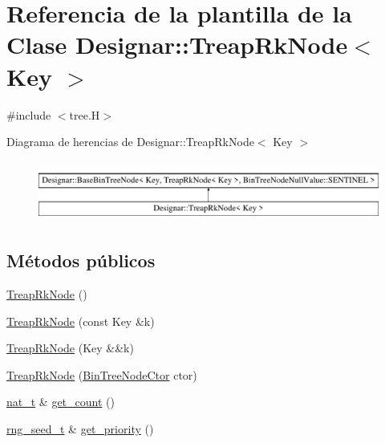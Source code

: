 \hypertarget{class_designar_1_1_treap_rk_node}{}\section{Referencia de la plantilla de la Clase Designar\+:\+:Treap\+Rk\+Node$<$ Key $>$}
\label{class_designar_1_1_treap_rk_node}


{\ttfamily \#include $<$tree.\+H$>$}

Diagrama de herencias de Designar\+:\+:Treap\+Rk\+Node$<$ Key $>$\begin{figure}[H]
\begin{center}
\leavevmode
\includegraphics[height=2.000000cm]{class_designar_1_1_treap_rk_node}
\end{center}
\end{figure}
\subsection*{Métodos públicos}
\begin{DoxyCompactItemize}
\item 
\hyperlink{class_designar_1_1_treap_rk_node_a477ff390f32fe63244a0d69fb29fe72d}{Treap\+Rk\+Node} ()
\item 
\hyperlink{class_designar_1_1_treap_rk_node_af478d4d739e9f7cacf8337421f3dabcb}{Treap\+Rk\+Node} (const Key \&k)
\item 
\hyperlink{class_designar_1_1_treap_rk_node_a81c5eee2937311cfee5b30a03cd16a04}{Treap\+Rk\+Node} (Key \&\&k)
\item 
\hyperlink{class_designar_1_1_treap_rk_node_aeac25432a807225359883033f50404eb}{Treap\+Rk\+Node} (\hyperlink{namespace_designar_a679bc99fd69a3601faa5d6d47f865106}{Bin\+Tree\+Node\+Ctor} ctor)
\item 
\hyperlink{namespace_designar_aa72662848b9f4815e7bf31a7cf3e33d1}{nat\+\_\+t} \& \hyperlink{class_designar_1_1_treap_rk_node_a4396d6cb73dc8df8cdae3a94565995ef}{get\+\_\+count} ()
\item 
\hyperlink{namespace_designar_ad621b5646d45288c5d6a1e1dfe7531a8}{rng\+\_\+seed\+\_\+t} \& \hyperlink{class_designar_1_1_treap_rk_node_add770a59cfec151c17ac9f665d3ceb2f}{get\+\_\+priority} ()
\end{DoxyCompactItemize}

